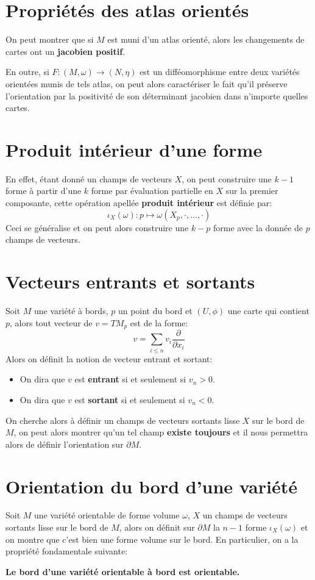    \section{Propriétés des atlas orientés}
      On peut montrer que si \( M \) est muni d'un atlas orienté, alors les changements de cartes ont un \textbf{jacobien positif}.\<
      
      En outre, si \( F : (M, \omega) \longrightarrow (N, \eta) \) est un difféomorphisme entre deux variétés orientées munis de tels atlas, on peut alors caractériser le fait qu'il préserve l'orientation par la positivité de son déterminant jacobien dans n'importe quelles cartes. 
   \section{Produit intérieur d'une forme}
         En effet, étant donné un champs de vecteurs \( X \), on peut construire une \( k-1 \) forme à partir d'une \( k \) forme par évaluation partielle en \( X \) sur la premier composante, cette opération apellée \textbf{produit intérieur} est définie par:
         \[ 
            \iota_X(\omega) : p \mapsto \omega(X_p, \cdot, \ldots, \cdot)
         \]
         Ceci se généralise et on peut alors construire une \( k-p \) forme avec la donnée de \( p \) champs de vecteurs.
   \section{Vecteurs entrants et sortants}
      Soit $M$ une variété à bords, $p$ un point du bord et $(U, \phi)$ une carte qui contient $p$, alors tout vecteur de $v = TM_p$ est de la forme:
      \[ 
         v = \sum_{i \leq n} v_i \frac{\partial}{\partial x_i}
      \]
      Alors on définit la notion de vecteur entrant et sortant:
      \begin{itemize}
         \item On dira que $v$ est \textbf{entrant} si et seulement si $v_n > 0$.
         \item On dira que $v$ est \textbf{sortant} si et seulement si $v_n < 0$. 
      \end{itemize}
      On cherche alors à définir un champs de vecteurs sortants lisse \( X \) sur le bord de \( M \), on peut alors montrer qu'un tel champ \textbf{existe toujours} et il nous permettra alors de définir l'orientation sur \( \partial M \).  
   \section{Orientation du bord d'une variété}
      Soit $M$ une variété orientable de forme volume $\omega$, $X$ un champs de vecteurs sortants lisse sur le bord de \( M \), alors on définit sur $\partial M$ la $n-1$ forme $\iota_X(\omega)$ et on montre que c'est bien une forme volume sur le bord. En particulier, on a la propriété fondamentale suivante:
      \begin{center}
         \textbf{Le bord d'une variété orientable à bord est orientable.}
      \end{center}
   \pagebreak
